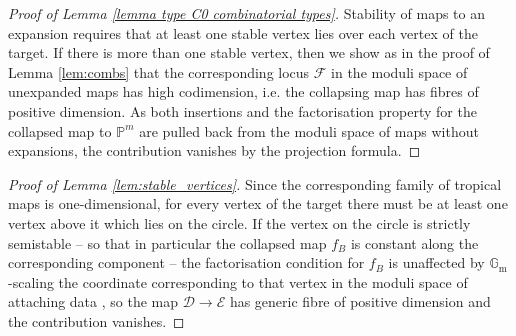 \documentclass[11pt]{amsart}
\newcommand{\sqC}{\scalebox{0.8}[1.3]{$\sqsubset$}}
\newcommand{\PP}{\mathbb P}
\renewcommand{\to}{\rightarrow}
\newcommand{\Gm}{\mathbb{G}_{\text{m}}}
\newcommand{\Dcal}{\mathcal{D}}
\newcommand{\Ecal}{\mathcal{E}}
\newcommand{\Fcal}{\mathcal{F}}
\theoremstyle{definition}
\theoremstyle{definition}
\begin{document}
\begin{proof}[Proof of Lemma \ref{lemma type C0 combinatorial types}]
Stability of maps to an expansion requires that at least one stable vertex lies over each vertex of the target. If there is more than one stable vertex, then we show as in the proof of Lemma \ref{lem:combs} that the corresponding locus $\Fcal$ in the moduli space of unexpanded maps has high codimension, i.e. the collapsing map has fibres of positive dimension. As both insertions and the factorisation property for the collapsed map to $\mathbb P^m$ are pulled back from the moduli space of maps without expansions, the contribution vanishes by the projection formula.
\end{proof}
\begin{proof}[Proof of Lemma \ref{lem:stable_vertices}]
Since the corresponding family of tropical maps is one-dimensional, for every vertex of the target there must be at least one vertex above it which lies on the circle. If the vertex on the circle is strictly semistable -- so that in particular the collapsed map $f_B$ is constant along the corresponding component -- the factorisation condition for $f_B$ is unaffected by $\Gm$-scaling the coordinate corresponding to that vertex in the moduli space of attaching data \cite[\S 2.2]{SMY2}, so the map $\Dcal\to\Ecal$ has generic fibre of positive dimension and the contribution vanishes.
\end{proof}
\begin{comment}

\begin{proof}[Proof of Lemma \ref{lem:corecontact}]
Consider the vertices that lie above $0\in\mathbb R_{\geq0}$ on the circle of radius $\delta$: the edges departing from them go directly (up to bubbling) to the core, since there cannot be stable vertices inside the open disc  when we have only one tropical parameter. In particular, all these edges have the same expansion factor $m$ (see again Figure \ref{fig:off_we_go}), which is maximal among those of the edges adjacent to the core. Indeed, all the edges from the core to the circle have the same length $\delta$, so the ones having maximal contact order are those that reach further from the core, and at least one must reach $0\in\mathbb R_{\geq0}$, for otherwise there would be an extra tropical parameter.

Finally, in case the maximal contact order is $m=1$, in order for $f_B$ to factor, the image of the tangent vectors at the components lying on the circle must be linearly dependent in $T_{\PP^m,x}$, where $x$ denotes the image of the core under $f_B$.in which case we can deduce as above that factorisation will be satisfied independently of the choice of alignment.
\end{proof}

For the remainder of this section we use the following notation for the combinatorial type $\Delta$; we let $\sqC_0$ denotes the vertex of dual graph corresponding to the core, $\sqC_1,\ldots,\sqC_r$ the other stable vertices (genus zero and lying on the circle, by the previous lemma) and $q_1,\ldots,q_r$ the corresponding splitting nodes.
 
\end{comment}
\end{document}
